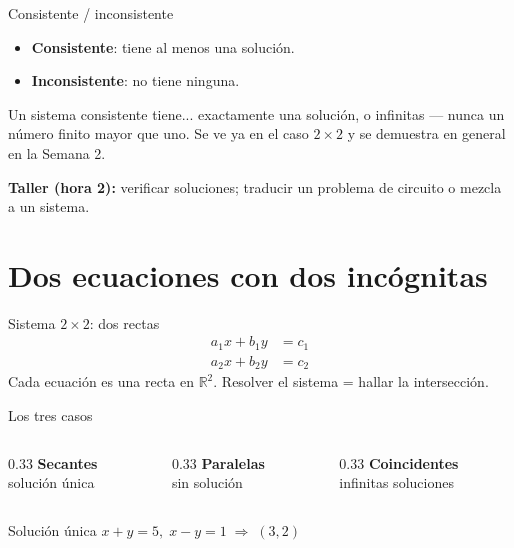 \documentclass[11pt]{beamer}
\newcommand{\R}{\mathbb{R}}
\begin{document}
\begin{frame}{Consistente / inconsistente}
  \begin{itemize}
    \item \textbf{Consistente}: tiene al menos una solución.
    \item \textbf{Inconsistente}: no tiene ninguna.
  \end{itemize}
  \begin{alertblock}{Un sistema consistente tiene...}
    exactamente una solución, o infinitas --- nunca un número finito mayor que uno. Se ve ya en
    el caso $2\times 2$ y se demuestra en general en la Semana 2.
  \end{alertblock}
  \vfill
  \textbf{Taller (hora 2):} verificar soluciones; traducir un problema de circuito o mezcla a un
  sistema.
\end{frame}

\section{Dos ecuaciones con dos incógnitas}

\begin{frame}{Sistema $2\times 2$: dos rectas}
  \[
  \begin{aligned}
    a_1x+b_1y &= c_1 \\
    a_2x+b_2y &= c_2
  \end{aligned}
  \]
  Cada ecuación es una recta en $\R^2$. Resolver el sistema = hallar la intersección.
\end{frame}

\begin{frame}{Los tres casos}
  \begin{columns}
    \begin{column}{0.33\textwidth}
      \centering \textbf{Secantes}\\ solución única
    \end{column}
    \begin{column}{0.33\textwidth}
      \centering \textbf{Paralelas}\\ sin solución
    \end{column}
    \begin{column}{0.33\textwidth}
      \centering \textbf{Coincidentes}\\ infinitas soluciones
    \end{column}
  \end{columns}
  \vfill
  \begin{exampleblock}{Solución única}
    $x+y=5,\; x-y=1 \;\Rightarrow\; (3,2)$
  \end{exampleblock}
\end{frame}
\end{document}
